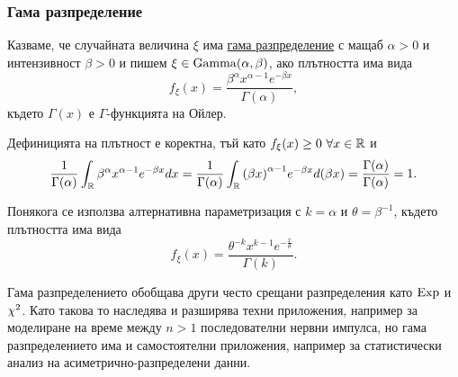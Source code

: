 \documentclass[numbers=endperiod, DIV=15, bibliography=totocnumbered]{scrartcl}
\begin{document}
\subsubsection{Гама разпределение}\label{dist:gamma}

\begin{definition}
  Казваме, че случайната величина $\xi$ има \uline{гама разпределение} с мащаб $\alpha > 0$ и интензивност $\beta > 0$ и пишем $\xi \in \operatorname{Gamma}(\alpha, \beta)$, ако плътността има вида
  \begin{displaymath}
    f_\xi(x) = \frac {\beta^\alpha x^{\alpha-1} e^{-\beta x}} {\Gamma(\alpha)},
  \end{displaymath}
  където $\Gamma(x)$ е $\Gamma$-функцията на Ойлер.

  Дефиницията на плътност е коректна, тъй като $f_\xi(x) \geq 0~\forall x \in \mathbb{R}$ и
  \begin{displaymath}
    \frac 1 {\Gamma(\alpha)} \int_{\mathbb{R}} {\beta^\alpha x^{\alpha-1} e^{-\beta x}} dx
    =
    \frac 1 {\Gamma(\alpha)} \int_{\mathbb{R}} {{(\beta x)}^{\alpha-1} e^{-\beta x}} d(\beta x)
    =
    \frac {\Gamma(\alpha)} {\Gamma(\alpha)}
    =
    1.
  \end{displaymath}

  Понякога се използва алтернативна параметризация с $k = \alpha$ и $\theta = \beta^{-1}$, където плътността има вида
  \begin{displaymath}
    f_\xi(x) = \frac {\theta^{-k} x^{k-1} e^{-\frac x \theta}} {\Gamma(k)}.
  \end{displaymath}
\end{definition}

Гама разпределението обобщава други често срещани разпределения като $\operatorname{Exp}$ и $\operatorname{\chi^2}$. Като такова то наследява и разширява техни приложения, например за моделиране на време между $n > 1$ последователни нервни импулса, но гама разпределението има и самостоятелни приложения, например за статистически анализ на асиметрично-разпределени данни.
\end{document}

